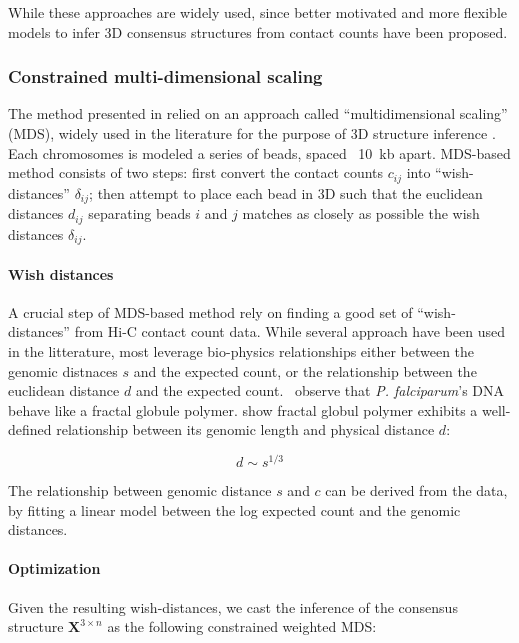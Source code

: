 \documentclass[oupdraft]{bio}
\begin{document}
While these approaches are widely used, since better motivated and more
flexible models to infer 3D consensus structures from contact counts have been
proposed. 

\subsubsection{Constrained multi-dimensional scaling}

The method presented in \citet{ay:three-dimensional} relied on an
approach called ``multidimensional scaling'' (MDS), widely used in the
literature for the purpose of 3D structure inference
\citep{duan:three-dimensional, varoquaux:statistical, bau:, tanizawa:}. Each chromosomes is
modeled a series of beads, spaced ~10~kb apart. MDS-based method consists of
two steps: first convert the
contact counts $c_{ij}$ into ``wish-distances'' $\delta_{ij}$; then attempt
to place each bead in 3D such that the euclidean distances $d_{ij}$ separating
beads $i$ and $j$ matches as closely as possible the wish distances
$\delta_{ij}$.

\paragraph{Wish distances}

A crucial step of MDS-based method rely on finding a good set of
``wish-distances'' from Hi-C contact count data. While several approach have
been used in the litterature, most leverage bio-physics relationships either
between the genomic distnaces $s$ and the expected count, or the relationship
between the euclidean distance $d$ and the expected
count. \citet{ay:three-dimensional} observe that {\em P. falciparum}'s DNA
behave like a fractal globule polymer. \citet{grosberg:fractal} show fractal
globul polymer exhibits a well-defined relationship between its genomic length
and physical distance $d$:

$$d\sim s^{1/3}$$

The relationship between genomic distance $s$ and $c$ can be derived from the
data, by fitting a linear model between the log expected count and the genomic
distances.

\paragraph{Optimization}

Given the resulting wish-distances, we cast the inference of the consensus
structure $\mathbf{X}^{3 \times n}$ as the following constrained weighted MDS:
\end{document}
